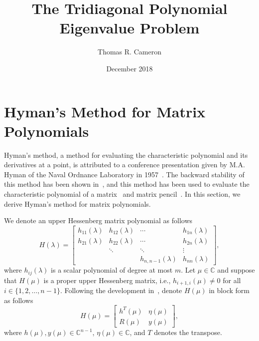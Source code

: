 \documentclass{article}
\title{The Tridiagonal Polynomial Eigenvalue Problem}
\author{Thomas R. Cameron}
\date{December 2018}
\begin{document}
\maketitle
{}

\section{Hyman's Method for Matrix Polynomials}
Hyman's method, a method for evaluating the characteristic polynomial and its derivatives at a point, is attributed to a conference presentation given by M.A. Hyman of the Naval Ordnance Laboratory in 1957~\cite{Wilkinson1963}. 
The backward stability of this method has been shown in~\cite{Higham2002,Wilkinson1963}, and this method has been used to evaluate the characteristic polynomial of a matrix~\cite{Parlett1964} and matrix pencil~\cite{Gary1965}.
In this section, we derive Hyman's method for matrix polynomials. 

We denote an upper Hessenberg matrix polynomial as follows 
\[
H(\lambda)=
\begin{bmatrix}
h_{11}(\lambda) & h_{12}(\lambda) & \cdots & h_{1n}(\lambda)\\ 
h_{21}(\lambda) & h_{22}(\lambda) & \cdots & h_{2n}(\lambda)\\ 
& \ddots & \ddots & \vdots\\ 
& & h_{n,n-1}(\lambda) & h_{nn}(\lambda)
\end{bmatrix},
\] 
where $h_{ij}(\lambda)$ is a scalar polynomial of degree at most $m$.
Let $\mu\in\mathbb{C}$ and suppose that $H(\mu)$ is a proper upper Hessenberg matrix, i.e., $h_{i+1,i}(\mu)\neq 0$ for all $i\in\{1,2,\ldots,n-1\}$.
Following the development in~\cite[Section 14.6.1]{Higham2002}, denote $H(\mu)$ in block form as follows
\[
H(\mu)=
\begin{bmatrix}
h^{T}(\mu) & \eta(\mu) \\
R(\mu) & y(\mu)
\end{bmatrix},
\]
where $h(\mu),y(\mu)\in\mathbb{C}^{n-1}$, $\eta(\mu)\in\mathbb{C}$, and $T$ denotes the transpose.
\end{document}
